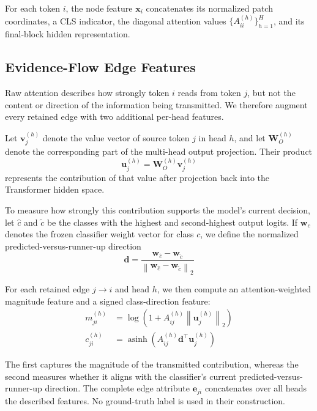 \documentclass[11pt]{article}
\begin{document}
For each token $i$, the node feature $\mathbf{x}_i$ concatenates its normalized
patch coordinates, a CLS indicator, the diagonal attention values
$\{A_{ii}^{(h)}\}_{h=1}^{H}$, and its final-block hidden representation. 

\subsection{Evidence-Flow Edge Features}

Raw attention describes how strongly token $i$ reads from token $j$, but not
the content or direction of the information being transmitted. We therefore
augment every retained edge with two additional per-head features.

Let $\mathbf{v}_j^{(h)}$ denote the value vector of source token $j$ in head
$h$, and let $\mathbf{W}_O^{(h)}$ denote the corresponding part of the
multi-head output projection. Their product
\begin{equation}
\mathbf{u}_j^{(h)}
=
\mathbf{W}_O^{(h)}\mathbf{v}_j^{(h)}
\label{eq:transformed-value}
\end{equation}
represents the contribution of that value after projection back into the
Transformer hidden space.

To measure how strongly this contribution supports the model's current
decision, let $\hat c$ and $\tilde c$ be the classes with the highest and
second-highest output logits. If $\mathbf{w}_c$ denotes the frozen classifier
weight vector for class $c$, we define the normalized predicted-versus-runner-up
direction
\begin{equation}
\mathbf{d}
=
\frac{
\mathbf{w}_{\hat c}-\mathbf{w}_{\tilde c}
}{
\left\|
\mathbf{w}_{\hat c}-\mathbf{w}_{\tilde c}
\right\|_2
}
\label{eq:class-direction}
\end{equation}

For each retained edge $j\rightarrow i$ and head $h$, we then compute an
attention-weighted magnitude feature and a signed class-direction feature:
\begin{equation}
\begin{aligned}
m_{ji}^{(h)}
&=
\log\!\left(
1+
A_{ij}^{(h)}
\left\|
\mathbf{u}_j^{(h)}
\right\|_2
\right)
\\
c_{ji}^{(h)}
&=
\operatorname{asinh}\!\left(
A_{ij}^{(h)}
\mathbf{d}^{\top}\mathbf{u}_j^{(h)}
\right)
\end{aligned}
\label{eq:evidence-features}
\end{equation}

The first captures the magnitude of the transmitted contribution, whereas the
second measures whether it aligns with the classifier's current
predicted-versus-runner-up direction. The complete edge attribute $\mathbf{e}_{ji}$ concatenates over all heads the described features. No ground-truth label is used in their construction.
\end{document}
